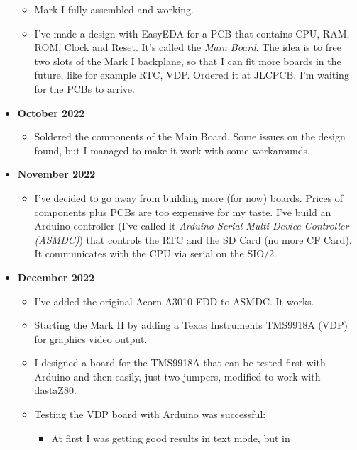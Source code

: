 \documentclass[a4paper,11pt]{article}
\begin{document}
\begin{itemize}
        \begin{itemize}
            \item Mark I fully assembled and working.
            \item I've made a design with EasyEDA for a PCB that contains CPU,
            RAM, ROM, Clock and Reset. It's called the \textit{Main Board}. The
            idea is to free two slots of the Mark I backplane, so that I can fit
            more boards in the future, like for example RTC, VDP. Ordered it at
            JLCPCB. I'm waiting for the PCBs to arrive.
        \end{itemize}
        \item \textbf{October 2022}
        \begin{itemize}
            \item Soldered the components of the Main Board. Some issues on the
            design found, but I managed to make it work with some workarounds.
        \end{itemize}
        \item \textbf{November 2022}
        \begin{itemize}
            \item I've decided to go away from building more (for now) boards.
            Prices of components plus PCBs are too expensive for my taste. I've
            build an Arduino controller (I've called it \textit{Arduino Serial
            Multi-Device Controller (ASMDC)}) that controls the RTC and the SD
            Card (no more CF Card). It communicates with the CPU via serial on
            the SIO/2.
        \end{itemize}
        \item \textbf{December 2022}
        \begin{itemize}
            \item I've added the original Acorn A3010 FDD to ASMDC. It works.
            \item Starting the Mark II by adding a Texas Instruments TMS9918A
            (VDP) for graphics video output.
            \item I designed a board for the TMS9918A that can be tested first
            with Arduino and then easily, just two jumpers, modified to work
            with dastaZ80.
            \item Testing the VDP board with Arduino was successful: 
            \begin{itemize}
                \item At first I was getting good results in text mode, but in

\end{itemize}
\end{itemize}
\end{itemize}
\end{document}
